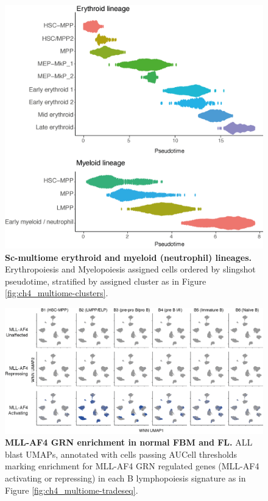 
\begin{figure}[p]
    \centering
    \includegraphics[width=\textwidth,height=\textheight,keepaspectratio]{figures/appendix/app_multiome-other-pseudo.png}
    \caption[{Sc-multiome erythroid and myeloid (neutrophil) lineages.}]
    {\textbf{Sc-multiome erythroid and myeloid (neutrophil) lineages.} 
    Erythropoiesis and Myelopoiesis assigned cells ordered by slingshot pseudotime, stratified by assigned cluster as in Figure \ref{fig:ch4_multiome-clusters}.
    }
    \label{fig:app_multiome-other-pseudo}
\end{figure}
\clearpage

\begin{figure}[p]
    \centering
    \includegraphics[width=\textwidth,height=\textheight,keepaspectratio]{figures/appendix/app_multiome-grn-enrich.png}
    \caption[{MLL-AF4 GRN enrichment in normal FBM and FL.}]
    {\textbf{MLL-AF4 GRN enrichment in normal FBM and FL.} 
    ALL blast UMAPs, annotated with cells passing AUCell thresholds marking enrichment for MLL-AF4 GRN regulated genes (MLL-AF4 activating or repressing) in each B lymphopoiesis signature as in Figure \ref{fig:ch4_multiome-tradeseq}.
    }
    \label{fig:app_multiome-grn-enrich}
\end{figure}
\clearpage


